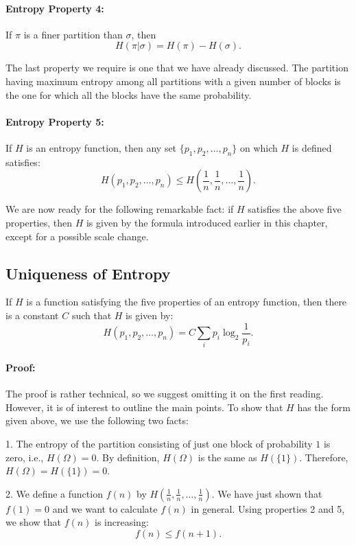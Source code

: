 \documentclass{report}
\begin{document}
\paragraph{Entropy Property 4:} 
If \( \pi \) is a finer partition than \( \sigma \), then
\[
H(\pi|\sigma) = H(\pi) - H(\sigma).
\]

The last property we require is one that we have already discussed. The partition having maximum entropy among all partitions with a given number of blocks is the one for which all the blocks have the same probability.

\paragraph{Entropy Property 5:} 
If \( H \) is an entropy function, then any set \( \{p_1, p_2, \ldots, p_n\} \) on which \( H \) is defined satisfies:
\[
H(p_1, p_2, \ldots, p_n) \leq H\left(\frac{1}{n}, \frac{1}{n}, \ldots, \frac{1}{n}\right).
\]

We are now ready for the following remarkable fact: if \( H \) satisfies the above five properties, then \( H \) is given by the formula introduced earlier in this chapter, except for a possible scale change.

\subsection*{Uniqueness of Entropy}
If \( H \) is a function satisfying the five properties of an entropy function, then there is a constant \( C \) such that \( H \) is given by:
\[
H(p_1, p_2, \ldots, p_n) = C \sum_{i} p_i \log_2 \frac{1}{p_i}.
\]

\paragraph{Proof:} 
The proof is rather technical, so we suggest omitting it on the first reading. However, it is of interest to outline the main points. To show that \( H \) has the form given above, we use the following two facts:

1. The entropy of the partition consisting of just one block of probability \( 1 \) is zero, i.e., \( H(\Omega) = 0 \). By definition, \( H(\Omega) \) is the same as \( H(\{1\}) \). Therefore, \( H(\Omega) = H(\{1\}) = 0 \).

2. We define a function \( f(n) \) by \( H\left(\frac{1}{n}, \frac{1}{n}, \ldots, \frac{1}{n}\right) \). We have just shown that \( f(1) = 0 \) and we want to calculate \( f(n) \) in general. Using properties 2 and 5, we show that \( f(n) \) is increasing:
\[
f(n) \leq f(n+1).
\]
\end{document}
